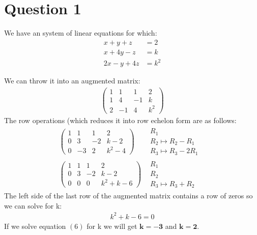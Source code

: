 \documentclass[12pt]{article}
\begin{document}
\pagebreak
\tableofcontents
\pagebreak

\section{Question 1}
We have an system of linear equations for which:
\begin{align}
x+y+z &= 2 \\
x + 4y - z &= k \\
2x-y + 4z &= k^2 
\end{align} 

We can throw it into an augmented matrix:
\begin{align*}
\left(\begin{array}{ccc|c}
1 & 1 & 1 & 2 \\
1 & 4 & -1 & k \\
2 & -1 & 4 & k^2
\end{array}\right)
\end{align*}
The row operations (which reduces it into row echelon form are as follows:
\begin{align}
\left(\begin{array}{ccc|c}
1 & 1 & 1 & 2 \\
0 & 3 & -2 & k-2 \\
0 & -3 & 2 & k^2-4
\end{array}\right)&
\begin{array}{l}
  \text{$R_1$}\\
  \text{$R_2 \longmapsto R_2-R_1$}\\
  \text{$R_3 \longmapsto R_3-2R_1$ }
\end{array}
\\
\left(\begin{array}{ccc|c}
1 & 1 & 1 & 2 \\
0 & 3 & -2 & k-2 \\
0 & 0 & 0 & k^2+k-6
\end{array}\right)&
\begin{array}{l}
  \text{$R_1$}\\
  \text{$R_2$}\\
  \text{$R_3 \longmapsto R_3+R_2$ }
\end{array}
\end{align}
The left side of the last row of the augmented matrix contains a row of zeros so we can solve for k:
\begin{align}
 k^2+k-6=0
\end{align}
If we solve equation $(6)$ for k we will get $\bm{k = -3}$ and $\bm{k=2}$.  \\
\newpage
\end{document}

